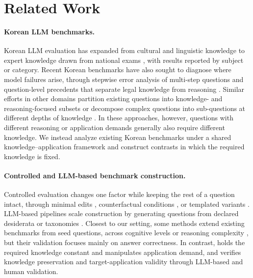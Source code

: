\section{Related Work}

\paragraph{Korean LLM benchmarks.}
Korean LLM evaluation has expanded from cultural and linguistic knowledge \citep{kim2024click} to expert knowledge drawn from national exams \citep{son2025kmmlu, hong-etal-2025-kmmlu}, with results reported by subject or category.
Recent Korean benchmarks have also sought to diagnose where model failures arise, through stepwise error analysis of multi-step questions \citep{son2025multi} and question-level precedents that separate legal knowledge from reasoning \citep{oh2026korean}.
Similar efforts in other domains partition existing questions into knowledge- and reasoning-focused subsets \citep{thapa2025disentangling} or decompose complex questions into sub-questions at different depths of knowledge \citep{ko2024hierarchical}.
In these approaches, however, questions with different reasoning or application demands generally also require different knowledge. 
We instead analyze existing Korean benchmarks under a shared knowledge--application framework and construct contrasts in which the required knowledge is fixed.

\paragraph{Controlled and LLM-based benchmark construction.}
Controlled evaluation changes one factor while keeping the rest of a question intact, through minimal edits \citep{gardner2020evaluating}, counterfactual conditions \citep{wu2024reasoning}, or templated variants \citep{mirzadeh2025gsm}.
LLM-based pipelines scale construction by generating questions from declared desiderata \citep{li2025autobencher} or taxonomies \citep{davidson2026reasoning}.
Closest to our setting, some methods extend existing benchmarks from seed questions, across cognitive levels \citep{cao2024structeval} or reasoning complexity \citep{zhang2024darg}, but their validation focuses mainly on answer correctness.
In contrast, \name{} holds the required knowledge constant and manipulates application demand, and verifies knowledge preservation and target-application validity through LLM-based and human validation. 